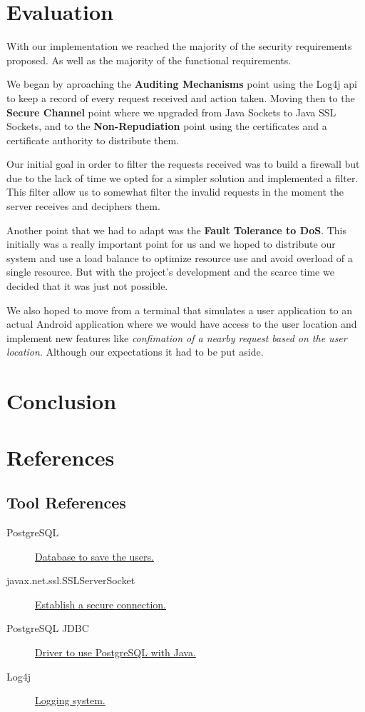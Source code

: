 \documentclass[a4paper,titlepage,11pt]{article}
\begin{document}
\section{Evaluation}
With our implementation we reached the majority of the security requirements proposed. As well as the majority of the
functional requirements.

We began by aproaching the \textbf{Auditing Mechanisms} point using the Log4j api to keep a record of every request received and
action taken. Moving then to the \textbf{Secure Channel} point where we upgraded from Java Sockets to Java SSL Sockets, and to the
\textbf{Non-Repudiation} point using the certificates and a certificate authority to distribute them.

Our initial goal in order to filter the requests received was to build a firewall but due to the lack of time we opted for a
simpler solution and implemented a filter. This filter allow us to somewhat filter the invalid requests in the moment the server
receives and deciphers them.

Another point that we had to adapt was the \textbf{Fault Tolerance to DoS}. This initially was a really important point for us and we
hoped to distribute our system and use a load balance to optimize resource use and avoid overload of a single resource. But with the
project's development and the scarce time we decided that it was just not possible.

We also hoped to move from a terminal that simulates a user application to an actual Android application where we would have access to
the user location and implement new features like \textit{confimation of a nearby request based on the user location}. Although our
expectations it had to be put aside.

\section{Conclusion}

\section{References}

\subsection{Tool References}
\begin{description}
  \item [PostgreSQL] \href{https://www.postgresql.org}{Database to save the users.}
  \item [javax.net.ssl.SSLServerSocket] \href{https://docs.oracle.com/javase/7/docs/api/java/net/Socket.html}{Establish a secure connection.}
  \item [PostgreSQL JDBC] \href{https://jdbc.postgresql.org}{Driver to use PostgreSQL with Java.}
  \item [Log4j] \href{http://logging.apache.org/log4j/2.x/}{Logging system.}
\end{description}
\end{document}

